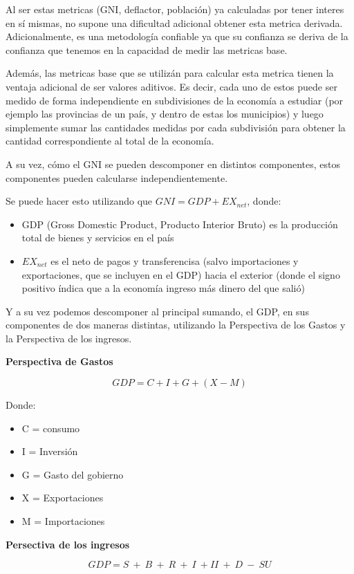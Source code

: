 \documentclass[11pt,a4paper]{tesis}
\begin{document}
Al ser estas metricas (GNI, deflactor, población) ya calculadas por tener interes en sí mismas, no supone una dificultad adicional obtener esta metrica derivada. Adicionalmente, es una metodología confiable ya que su confianza se deriva de la confianza que tenemos en la capacidad de medir las metricas base.

Además, las metricas base que se utilizán para calcular esta metrica tienen la ventaja adicional de ser valores aditivos. Es decir, cada uno de estos puede ser medido de forma independiente en subdivisiones de la economía a estudiar (por ejemplo las provincias de un país, y dentro de estas los municipios) y luego simplemente sumar las cantidades medidas por cada subdivisión para obtener la cantidad correspondiente al total de la economía. 

A su vez, cómo el GNI se pueden descomponer en distintos componentes, estos componentes pueden calcularse independientemente.

Se puede hacer esto utilizando que $GNI = GDP + EX_{net}$, donde:
\begin{itemize}
    \item GDP (Gross Domestic Product, Producto Interior Bruto) es la producción total de bienes y servicios en el país
    \item $EX_{net}$ es el neto de pagos y transferencisa (salvo importaciones y exportaciones, que se incluyen en el GDP) hacia el exterior (donde el signo positivo índica que a la economía ingreso más dinero del que salió)
\end{itemize}

Y a su vez podemos descomponer al principal sumando, el GDP, en sus componentes de dos maneras distintas, utilizando la Perspectiva de los Gastos y la Perspectiva de los ingresos.

\textbf{Perspectiva de Gastos}

$$
GDP = C + I + G + (X-M)
$$

Donde:
\begin{itemize}
    \item C = consumo
    \item I = Inversión
    \item G = Gasto del gobierno
    \item X = Exportaciones
    \item M = Importaciones
\end{itemize}

\textbf{Persectiva de los ingresos}

$$
GDP = S\ +\ B\ +\ R\ +\ I\ + II\ +\ D\ -\ SU 
$$
\end{document}
